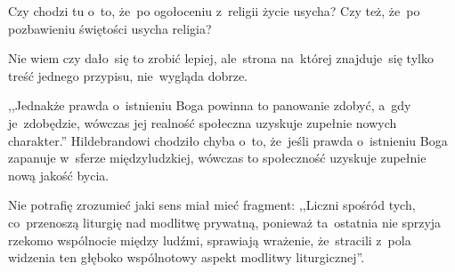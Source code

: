 \documentclass[a4paper,11pt]{article}
\begin{document}
\vspace{\spaceTwo}










\start {} Czy chodzi tu o~to, że~po ogołoceniu z~religii
życie usycha? Czy też, że~po pozbawieniu świętości usycha religia?

\vspace{\spaceFour}


\start {} Nie wiem czy dało~się to zrobić lepiej, ale~strona
na~której znajduje~się tylko treść jednego przypisu, nie~wygląda
dobrze.

\vspace{\spaceFour}


\start {} ,,Jednakże prawda o~istnieniu Boga powinna to
panowanie zdobyć, a~gdy je~zdobędzie, wówczas jej realność społeczna
uzyskuje zupełnie nowych charakter.'' Hildebrandowi chodziło chyba
o~to, że~jeśli prawda o~istnieniu Boga zapanuje w~sferze
międzyludzkiej, wówczas to społeczność uzyskuje zupełnie nową jakość
bycia.

\vspace{\spaceFour}


\start {} Nie potrafię zrozumieć jaki sens miał mieć fragment:
,,Liczni spośród tych, co~przenoszą liturgię nad modlitwę prywatną,
ponieważ ta~ostatnia nie sprzyja rzekomo wspólnocie między ludźmi,
sprawiają wrażenie, że~stracili z~pola widzenia ten głęboko
wspólnotowy aspekt modlitwy liturgicznej''.
\end{document}

